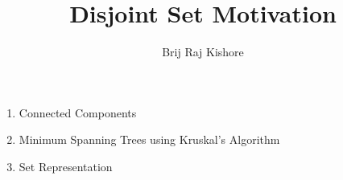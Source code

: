 \documentclass[12pt,twocolumn]{article}
\title{Disjoint Set Motivation}
\date{}
\author{Brij Raj Kishore}
\begin{document}
	\maketitle
		\begin{enumerate}
			\item Connected Components
			\item Minimum Spanning Trees using Kruskal's Algorithm
			\item Set Representation
		\end{enumerate}
\end{document}
